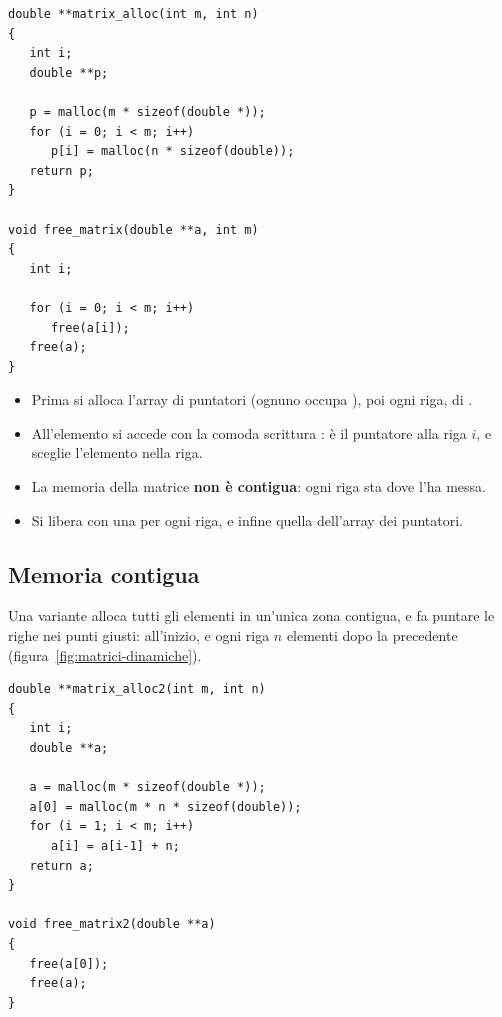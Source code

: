\begin{affianco}[0.5][c]
\begin{lstlisting}[style=c, name=matrici.c]
double **matrix_alloc(int m, int n)
{
   int i;
   double **p;

   p = malloc(m * sizeof(double *));
   for (i = 0; i < m; i++)
      p[i] = malloc(n * sizeof(double));
   return p;
}

void free_matrix(double **a, int m)
{
   int i;

   for (i = 0; i < m; i++)
      free(a[i]);
   free(a);
}
\end{lstlisting}
\risultato
\begin{itemize}
  \item Prima si alloca l'array di  puntatori (ognuno occupa
        ), poi ogni riga, di  .
  \item All'elemento si accede con la comoda scrittura :
         è il puntatore alla riga $i$, e \code{[j]} sceglie
        l'elemento nella riga.
  \item La memoria della matrice \textbf{non è contigua}: ogni riga sta
        dove  l'ha messa.
  \item Si libera con una  per ogni riga, e infine quella
        dell'array dei puntatori.
\end{itemize}
\end{affianco}

\subsection{Memoria contigua}

Una variante alloca tutti gli elementi in un'unica zona contigua, e fa
puntare le righe nei punti giusti:  all'inizio, e ogni riga $n$
elementi dopo la precedente (figura~\ref{fig:matrici-dinamiche}).

\begin{affianco}[0.5][c]
\begin{lstlisting}[style=c]
double **matrix_alloc2(int m, int n)
{
   int i;
   double **a;

   a = malloc(m * sizeof(double *));
   a[0] = malloc(m * n * sizeof(double));
   for (i = 1; i < m; i++)
      a[i] = a[i-1] + n;
   return a;
}

void free_matrix2(double **a)
{
   free(a[0]);
   free(a);
}
\end{lstlisting}
\risultato
{}
\end{affianco}

